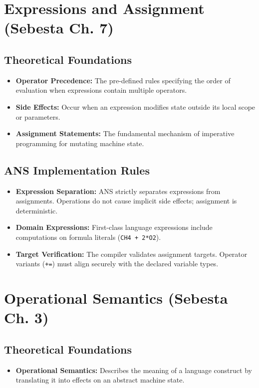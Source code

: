 \documentclass[11pt,a4paper]{article}
\newcommand{\code}[1]{\texttt{#1}}
\begin{document}
\section{Expressions and Assignment (Sebesta Ch. 7)}
\subsection*{Theoretical Foundations}
\begin{itemize}
    \item \textbf{Operator Precedence:} The pre-defined rules specifying the order of evaluation when expressions contain multiple operators.
    \item \textbf{Side Effects:} Occur when an expression modifies state outside its local scope or parameters. 
    \item \textbf{Assignment Statements:} The fundamental mechanism of imperative programming for mutating machine state.
\end{itemize}

\subsection*{ANS Implementation Rules}
\begin{itemize}
    \item \textbf{Expression Separation:} ANS strictly separates expressions from assignments. Operations do not cause implicit side effects; assignment is deterministic.
    \item \textbf{Domain Expressions:} First-class language expressions include computations on formula literals (\code{CH4 + 2*O2}).
    \item \textbf{Target Verification:} The compiler validates assignment targets. Operator variants (\code{+=}) must align securely with the declared variable types.
\end{itemize}

\section{Operational Semantics (Sebesta Ch. 3)}
\subsection*{Theoretical Foundations}
\begin{itemize}
    \item \textbf{Operational Semantics:} Describes the meaning of a language construct by translating it into effects on an abstract machine state.
\end{itemize}
\end{document}
